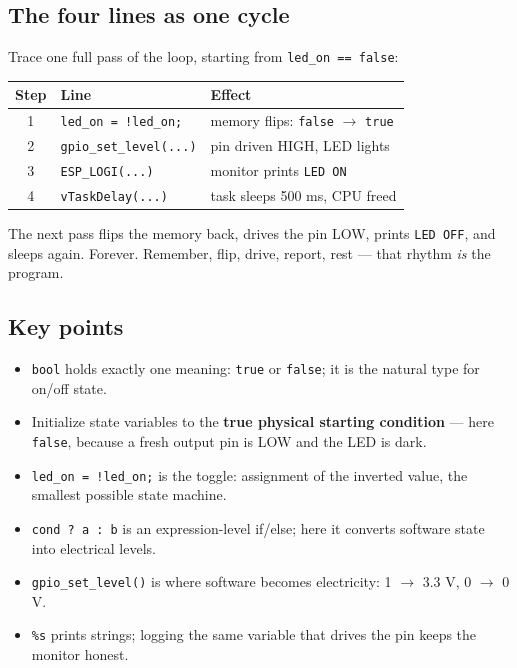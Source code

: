 \documentclass[11pt]{article}
\begin{document}
\subsection{The four lines as one cycle}

Trace one full pass of the loop, starting from \texttt{led\_on == false}:

\begin{table}[htbp]
\centering
\renewcommand{\arraystretch}{1.3}
\begin{tabularx}{\textwidth}{@{}c l X@{}}
\toprule
\textbf{Step} & \textbf{Line} & \textbf{Effect} \\
\midrule
1 & \texttt{led\_on = !led\_on;} & memory flips: \texttt{false} $\rightarrow$ \texttt{true} \\
2 & \texttt{gpio\_set\_level(...)} & pin driven HIGH, LED lights \\
3 & \texttt{ESP\_LOGI(...)} & monitor prints \texttt{LED ON} \\
4 & \texttt{vTaskDelay(...)} & task sleeps 500 ms, CPU freed \\
\bottomrule
\end{tabularx}
\end{table}

The next pass flips the memory back, drives the pin LOW, prints \texttt{LED OFF}, and sleeps again. Forever. Remember, flip, drive, report, rest --- that rhythm \emph{is} the program.

\subsection{Key points}

\begin{itemize}
    \item \texttt{bool} holds exactly one meaning: \texttt{true} or \texttt{false}; it is the natural type for on/off state.
    \item Initialize state variables to the \textbf{true physical starting condition} --- here \texttt{false}, because a fresh output pin is LOW and the LED is dark.
    \item \texttt{led\_on = !led\_on;} is the toggle: assignment of the inverted value, the smallest possible state machine.
    \item \texttt{cond ? a : b} is an expression-level if/else; here it converts software state into electrical levels.
    \item \texttt{gpio\_set\_level()} is where software becomes electricity: 1 $\rightarrow$ 3.3 V, 0 $\rightarrow$ 0 V.
    \item \texttt{\%s} prints strings; logging the same variable that drives the pin keeps the monitor honest.
\end{itemize}
\end{document}
